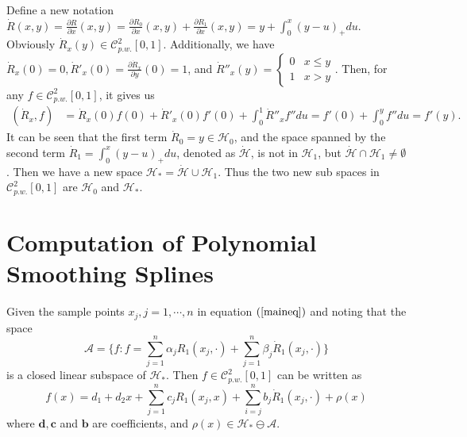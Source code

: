 Define a new notation $\dot{R}(x,y)=\frac{\partial R}{\partial x}(x,y)=\frac{\partial R_0}{\partial x}(x,y)+\frac{\partial R_1}{\partial x}(x,y)=y+\int_0^x(y-u)_+du$. Obviously $\dot{R}_x(y) \in \mathcal{C}_{p.w.}^{2}[0,1]$. Additionally, we have $\dot{R}_x(0)=0, \dot{R}'_x(0)=\frac{\partial \dot{R}_x}{\partial y}(0)=1$, and $ \dot{R}''_x(y)=\begin{cases}
0 & x\leq y \\ 1 & x>y \end{cases}$. Then, for any $f\in \mathcal{C}_{p.w.}^{2}[0,1]$, it gives us 
\begin{align*}
(\dot{R}_x,f) &=\dot{R}_x(0)f(0)+\dot{R}'_x(0)f'(0)+\int_0^1\dot{R}''_x f''	 du=f'(0)+\int_0^y f''du=f'(y).
\end{align*}
It can be seen that the first term $\dot{R}_0=y\in \mathcal{H}_0$, and the space spanned by the second term  $\dot{R}_1=\int_0^x(y-u)_+du$, denoted as $\mathcal{\dot{H}}$, is not in $\mathcal{H}_1$, but $\mathcal{\dot{H}} \cap \mathcal{H}_1\neq \emptyset$. Then we have a new space $\mathcal{H}_*=\mathcal{\dot{H}} \cup \mathcal{H}_1$. Thus the two new sub spaces in $\mathcal{C}_{p.w.}^2[0,1]$ are $\mathcal{H}_0$ and $\mathcal{H}_*$.


\section{Computation of Polynomial Smoothing Splines}

Given the sample points $x_j, j=1, \cdots, n$ in equation $(\ref{maineq})$ and noting that the space
\begin{equation}
\mathcal{A}=\{f: f=\sum_{j=1}^{n}\alpha_jR_1(x_j,\cdot)+\sum_{j=1}^{n}\beta_j\dot{R}_1(x_j,\cdot)\} 
\end{equation}
is a closed linear subspace of $\mathcal{H}_*$. Then $f  \in \mathcal{C}_{p.w.}^2[0,1]$ can be written as
\begin{equation}\label{etaeq}
f(x)=d_1+d_2x+\sum_{j=1}^{n}c_jR_1(x_j,x)+\sum_{i=j}^{n}b_j\dot{R}_1(x_j,\cdot) +\rho(x)
\end{equation}
where $\mathbf{d},\mathbf{c}$ and $\mathbf{b}$ are coefficients, and $\rho(x) \in \mathcal{H}_* \ominus \mathcal{A}$. 

